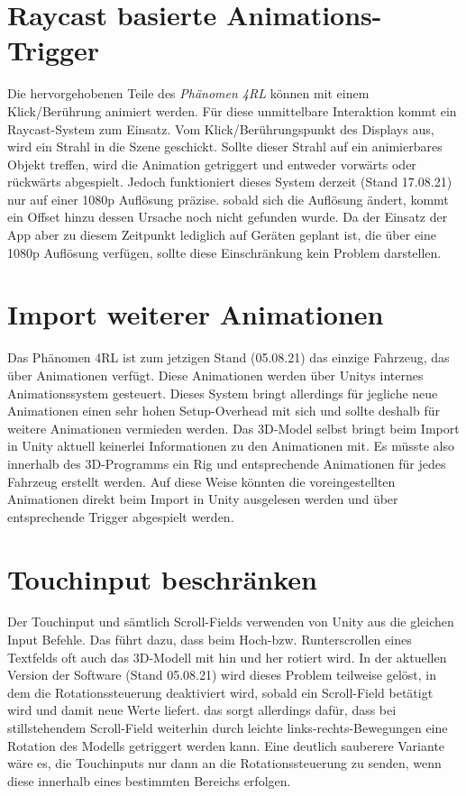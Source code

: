 \section{Raycast basierte Animations-Trigger}
%
Die hervorgehobenen Teile des \emph{Phänomen 4RL} können mit einem Klick/Berührung animiert werden. Für diese unmittelbare Interaktion kommt ein Raycast-System zum Einsatz. Vom Klick/Berührungspunkt des Displays aus, wird ein Strahl in die Szene geschickt. Sollte dieser Strahl auf ein animierbares Objekt treffen, wird die Animation getriggert und entweder vorwärts oder rückwärts abgespielt. Jedoch funktioniert dieses System derzeit (Stand 17.08.21) nur auf einer 1080p Auflösung präzise. sobald sich die Auflösung ändert, kommt ein Offset hinzu dessen Ursache noch nicht gefunden wurde. Da der Einsatz der App aber zu diesem Zeitpunkt lediglich auf Geräten geplant ist, die über eine 1080p Auflösung verfügen, sollte diese Einschränkung kein Problem darstellen.
%
\section{Import weiterer Animationen}
\label{sec:imp_anim}
%
Das Phänomen 4RL ist zum jetzigen Stand (05.08.21) das einzige Fahrzeug, das über Animationen verfügt. Diese Animationen werden über Unitys internes Animationssystem gesteuert. Dieses System bringt allerdings für jegliche neue Animationen einen sehr hohen Setup-Overhead mit sich und sollte deshalb für weitere Animationen vermieden werden. Das 3D-Model selbst bringt beim Import in Unity aktuell keinerlei Informationen zu den Animationen mit. Es müsste also innerhalb des 3D-Programms ein Rig und entsprechende Animationen für jedes Fahrzeug erstellt werden. Auf diese Weise könnten die voreingestellten Animationen direkt beim Import in Unity ausgelesen werden und über entsprechende Trigger abgespielt werden.
%
\pagebreak
%
\section{Touchinput beschränken}
\label{sec:limit_touch}
%
Der Touchinput und sämtlich Scroll-Fields verwenden von Unity aus die gleichen Input Befehle. Das führt dazu, dass beim Hoch-bzw. Runterscrollen eines Textfelds oft auch das 3D-Modell mit hin und her rotiert wird. In der aktuellen 
Version der Software (Stand 05.08.21) wird dieses Problem teilweise gelöst, in dem die Rotationssteuerung deaktiviert wird, sobald ein Scroll-Field betätigt wird und damit neue Werte liefert. das sorgt allerdings dafür, dass bei stillstehendem Scroll-Field weiterhin durch leichte links-rechts-Bewegungen eine Rotation des Modells getriggert werden kann. Eine deutlich sauberere Variante wäre es, die Touchinputs nur dann an die Rotationssteuerung zu senden, wenn diese innerhalb eines bestimmten Bereichs erfolgen.